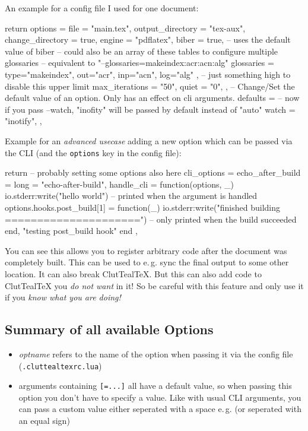 \documentclass[a4paper, 11pt]{scrartcl}
\newcommand\eg{e.\,g.\xspace}
\let\TeXold\TeX
\newcommand\CluttealTeX{ClutTeal\TeX\xspace}
\renewcommand\TeX{\TeXold\xspace}
\begin{document}
An example for a config file I used for one document:
\begin{boxcodelua}
return {
	options = {
		file = "main.tex",
		output_directory = "tex-aux",
		change_directory = true,
		engine = "pdflatex",
		biber = true, -- uses the default value of biber
		-- could also be an array of these tables to configure multiple glossaries
		-- equivalent to "--glossaries=makeindex:acr:acn:alg"
		glossaries = {
			type="makeindex",
			out="acr",
			inp="acn",
			log="alg"
		},
		-- just something high to disable this upper limit
		max_iterations = "50",
		quiet = "0",
	},
	-- Change/Set the default value of an option. Only has an effect on cli arguments.
	defaults = {
		-- now if you pass --watch, "inofity" will be passed by default instead of "auto"
		watch = "inotify",
	},
}
\end{boxcodelua}

Example for an \emph{advanced usecase} adding a new option which can be passed via the CLI (and the \texttt{options} key in the config file):
\begin{boxcodelua}
return {
	-- probably setting some options also here
	cli_options = {
		echo_after_build = {
			long = "echo-after-build",
			handle_cli = function(options, _)
			io.stderr:write("hello world\n") -- printed when the argument is handled
			options.hooks.post_build[1] = {function(_)
				io.stderr:write("finished building =====================\n") -- only printed when the build succeeded
			end, "testing post_build hook"}
			end
		},
	}
}
\end{boxcodelua}
You can see this allows you to register arbitrary code after the document was completely built.
This can be used to \eg sync the final output to some other location.
It can also break \CluttealTeX.
But this can also add code to \CluttealTeX you \emph{do not want} in it!
So be careful with this feature and only use it if you \emph{know what you are doing!}

\begin{landscape}
\section{Summary of all available Options} \label{sec:listOpt}
\begin{itemize}
	\item \emph{optname} refers to the name of the option when passing it via the config file (\texttt{.cluttealtexrc.lua})
	\item arguments containing \texttt{[=...]} all have a default value, so when passing this option you don't have to specify a value.
		Like with usual CLI arguments, you can pass a custom value either seperated with a space \eg {} (or seperated with an equal sign)
\end{itemize}

\end{landscape}
\end{document}
